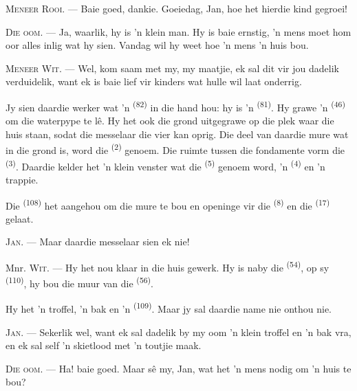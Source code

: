 \textsc{Meneer Rooi}. --- Baie goed, dankie. Goeiedag, Jan, hoe het hierdie kind
gegroei!

\textsc{Die oom}. --- Ja, waarlik, hy is 'n klein man. Hy is baie ernstig, 'n mens moet
hom oor alles inlig wat hy sien. Vandag wil hy weet hoe 'n mens 'n huis bou.

\VUsaut{3.0mm}

\textsc{Meneer Wit}. --- Wel, kom saam met my, my maatjie, ek sal dit vir jou dadelik
verduidelik, want ek is baie lief vir kinders wat hulle wil laat onderrig.

Jy sien daardie werker wat 'n  \textsuperscript{(82)} in die hand hou: hy
is 'n  \textsuperscript{(81)}. Hy grawe 'n 
\textsuperscript{(46)} om die waterpype te lê. Hy het ook die grond uitgegrawe op die
plek waar die huis staan, sodat die messelaar die vier  kan oprig. Die deel
van daardie mure wat in die grond is, word die 
\textsuperscript{(2)} genoem. Die ruimte tussen die fondamente vorm die 
\textsuperscript{(3)}. Daardie kelder het 'n klein venster wat die 
\textsuperscript{(5)} genoem word, 'n  \textsuperscript{(4)} en 'n trappie.

Die  \textsuperscript{(108)} het aangehou om die mure te bou en
openinge vir die  \textsuperscript{(8)} en die 
\textsuperscript{(17)} gelaat.

\textsc{Jan}. --- Maar daardie messelaar sien ek nie!

Mnr. \textsc{Wit}. --- Hy het nou klaar in die huis gewerk. Hy is naby die
 \textsuperscript{(54)}, op sy  \textsuperscript{(110)}, hy
bou die muur van die  \textsuperscript{(56)}.

Hy het 'n troffel, 'n bak en 'n  \textsuperscript{(109)}. Maar jy sal
daardie name nie onthou nie.

\textsc{Jan}. --- Sekerlik wel, want ek sal dadelik by my oom 'n klein troffel en 'n bak
vra, en ek sal self 'n skietlood met 'n toutjie maak.

\VUsaut{3.0mm}
\VUsaut{3.0mm}

\textsc{Die oom}. --- Ha! baie goed. Maar sê my, Jan, wat het 'n mens nodig om 'n huis
te bou?

